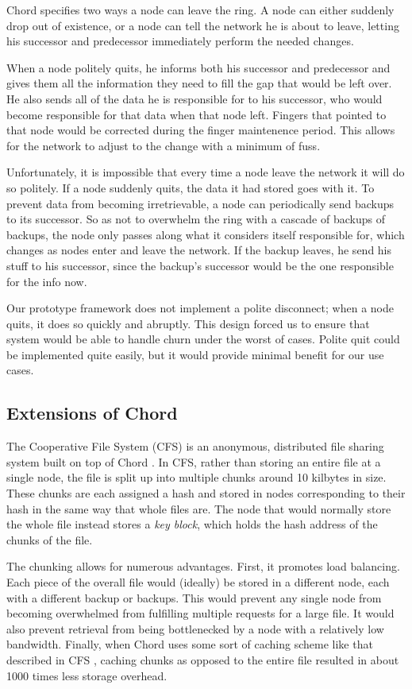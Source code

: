 \documentclass[conference, compsocconf, letterpaper]{IEEEtran}
\begin{document}
Chord specifies two ways a node can leave the ring.  A node can either suddenly drop out of existence, or a node can tell the network he is about to leave, letting his successor and predecessor immediately perform the needed changes.

When a node politely quits, he informs both his successor and predecessor and gives them all the information they need to fill the gap that would be left over. He also sends all of the data he is responsible for to his successor, who would become responsible for that data when that node left.  Fingers that pointed to that node would be corrected during the finger maintenence period.  This allows for the network to adjust to the change with a minimum of fuss.

Unfortunately, it is impossible that every time a node leave the network it will do so politely.  If a node suddenly quits, the data it had stored goes with it. To prevent data from becoming irretrievable, a node can periodically send backups to its successor.  So as not to overwhelm the ring with a cascade of backups of backups, the node only passes along what it considers itself responsible for, which changes as nodes enter and leave the network.  If the backup leaves, he send his stuff to his successor, since the backup's successor would be the one responsible for the info now. 

Our prototype framework does not implement a polite disconnect;  when a node quits, it does so quickly and abruptly.  This design forced us to ensure that system would be able to handle churn under the worst of cases.  Polite quit could be implemented quite easily, but it would provide minimal benefit for our use cases. 


\subsection{Extensions of Chord}

The Cooperative File System (CFS) is an anonymous, distributed file sharing system built on top of Chord \cite{CFS}.  In CFS, rather than storing an entire file at a single node, the file is split up into multiple chunks around 10 kilbytes in size.  These chunks are each assigned a hash and stored in nodes corresponding to their hash in the same way that whole files are.  The node that would normally store the whole file instead stores a \emph{key block}, which holds the hash address of the chunks of the file. 

The chunking allows for numerous advantages.  First, it promotes load balancing. Each piece of the overall file would (ideally) be stored in a different node, each with a different backup or backups.  This would prevent any single node from becoming overwhelmed from fulfilling multiple requests for a large file.  It would also prevent retrieval from being bottlenecked by a node with a relatively low bandwidth. Finally, when Chord uses some sort of caching scheme like that described in CFS \cite{CFS}, caching chunks as opposed to the entire file resulted in about 1000 times less storage overhead.  
\end{document}
